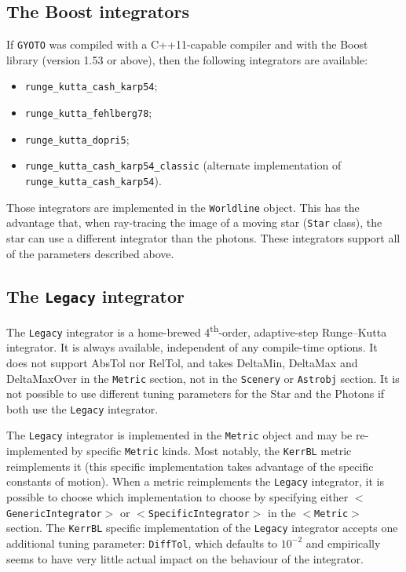 \documentclass[a4paper,12pt]{article}
\begin{document}
\subsection{The Boost integrators}

If \texttt{GYOTO} was compiled with a C++11-capable compiler and with
the Boost library (version 1.53 or above), then the following
integrators are available:
\begin{itemize}
\item \texttt{runge\_kutta\_cash\_karp54};
\item \texttt{runge\_kutta\_fehlberg78};
\item \texttt{runge\_kutta\_dopri5};
\item \texttt{runge\_kutta\_cash\_karp54\_classic} (alternate
  implementation of\\ \texttt{runge\_kutta\_cash\_karp54}).
\end{itemize}

Those integrators are implemented in the \texttt{Worldline}
object. This has the advantage that, when ray-tracing the image of a
moving star (\texttt{Star} class), the star can use a different
integrator than the photons. These integrators support all of the
parameters described above.


\subsection{The \texttt{Legacy} integrator}

The \texttt{Legacy} integrator is a home-brewed
4\textsuperscript{th}-order, adaptive-step Runge--Kutta integrator. It
is always available, independent of any compile-time options. It does
not support AbsTol nor RelTol, and takes DeltaMin, DeltaMax and
DeltaMaxOver in the \texttt{Metric} section, not in the
\texttt{Scenery} or \texttt{Astrobj} section. It is not possible to
use different tuning parameters for the Star and the Photons if both
use the \texttt{Legacy} integrator.

The \texttt{Legacy} integrator is implemented in the \texttt{Metric}
object and may be re-implemented by specific \texttt{Metric}
kinds. Most notably, the \texttt{KerrBL} metric reimplements it (this
specific implementation takes advantage of the specific constants of
motion). When a metric reimplements the \texttt{Legacy} integrator, it
is possible to choose which implementation to choose by specifying
either \texttt{$<$GenericIntegrator$>$} or
\texttt{$<$SpecificIntegrator$>$} in the \texttt{$<$Metric$>$}
section. The \texttt{KerrBL} specific implementation of the
\texttt{Legacy} integrator accepts one additional tuning parameter:
\texttt{DiffTol}, which defaults to $10^{-2}$ and empirically seems to
have very little actual impact on the behaviour of the integrator.
\end{document}
